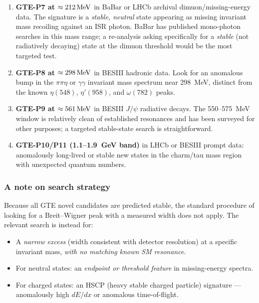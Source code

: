 \begin{enumerate}[leftmargin=2.5em,itemsep=3pt]
  \item \textbf{GTE-P7 at $\approx212\,\mathrm{MeV}$} in BaBar or LHCb archival dimuon/missing-energy
    data.  The signature is a \emph{stable, neutral} state appearing as missing invariant
    mass recoiling against an ISR photon.  BaBar has published mono-photon searches in
    this mass range; a re-analysis asking specifically for a \emph{stable} (not radiatively
    decaying) state at the dimuon threshold would be the most targeted test.

  \item \textbf{GTE-P8 at $\approx298\,\mathrm{MeV}$} in BESIII hadronic data.  Look for an anomalous
    bump in the $\pi\pi\eta$ or $\gamma\gamma$ invariant mass spectrum near 298~MeV,
    distinct from the known $\eta(548)$, $\eta'(958)$, and $\omega(782)$ peaks.

  \item \textbf{GTE-P9 at $\approx561\,\mathrm{MeV}$} in BESIII $J/\psi$ radiative decays.  The
    550--575~MeV window is relatively clean of established resonances and has been
    surveyed for other purposes; a targeted stable-state search is straightforward.

  \item \textbf{GTE-P10/P11 (1.1--1.9~GeV band)} in LHCb or BESIII prompt data:
    anomalously long-lived or stable new states in the charm/tau mass region with
    unexpected quantum numbers.
\end{enumerate}

\medskip

\subsubsection*{A note on search strategy}

Because all GTE novel candidates are predicted stable, the standard procedure of
looking for a Breit--Wigner peak with a measured width does not apply.  The
relevant search is instead for:
\begin{itemize}[leftmargin=2em,itemsep=2pt]
  \item A \emph{narrow excess} (width consistent with detector resolution) at a
    specific invariant mass, \emph{with no matching known SM resonance}.
  \item For neutral states: an \emph{endpoint or threshold feature} in
    missing-energy spectra.
  \item For charged states: an HSCP (heavy stable charged particle) signature ---
    anomalously high $dE/dx$ or anomalous time-of-flight.
\end{itemize}

